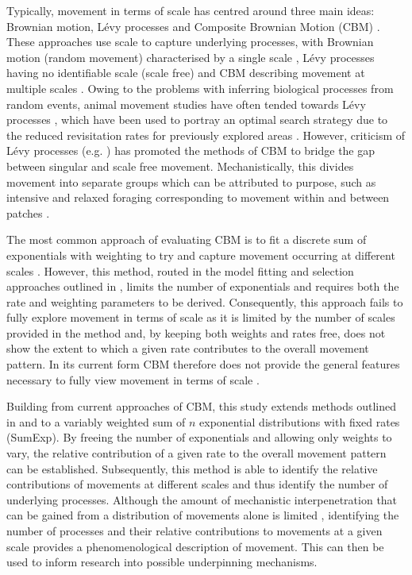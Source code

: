 \documentclass[11pt,usenames,dvipsnames,a4paper]{article}
\begin{document}
\begin{linenumbers}
Typically, movement in terms of scale has centred around three main ideas: Brownian motion, L\'evy processes and Composite Brownian Motion (CBM) \citep{Nathan2008, Reynolds2018}. These approaches use scale to capture underlying processes, with Brownian motion (random movement) characterised by a single scale \citep{Barthelemy2008}, L\'evy processes having no identifiable scale (scale free) \citep{Viswanathan1999, Barthelemy2008, Reynolds2018} and CBM describing movement at multiple scales \citep{Petrovskii2011, Jansen2012}. Owing to the problems with inferring biological processes from random events, animal movement studies have often tended towards L\'evy processes \citep{Harris2012, Ariel2015, Humphries2010, Baronchelli2013, Boyer, Ayala-Orozco2004, Sims2008, Viswanathan1999}, which have been used to portray an optimal search strategy due to the reduced revisitation rates for previously explored areas \citep{Viswanathan1999, Humphries2014}. However, criticism of L\'evy processes (e.g. \cite{Pyke2015}) has promoted the methods of CBM to bridge the gap between singular and scale free movement. Mechanistically, this divides movement into separate groups which can be attributed to purpose, such as intensive and relaxed foraging corresponding to movement within and between patches \citep{Auger-Methe2015}. 

The most common approach of evaluating CBM is to fit a discrete sum of exponentials with weighting to try and capture movement occurring at different scales \citep{DeJager2013, Jansen2012, Kolzsch2015, Wosniack2017}. However, this method, routed in the model fitting and selection approaches outlined in \cite{Murphy2007}, limits the number of exponentials and requires both the rate and weighting parameters to be derived. Consequently, this approach fails to fully explore movement in terms of scale as it is limited by the number of scales provided in the method \citep{Jansen2012} and, by keeping both weights and rates free, does not show the extent to which a given rate contributes to the overall movement pattern. In its current form CBM therefore does not provide the general features necessary to fully view movement in terms of scale \citep{Nathan2008, Patterson2017}. 

Building from current approaches of CBM, this study extends methods outlined in \cite{Petrovskii2011} and \cite{Jansen2012} to a variably weighted sum of $n$ exponential distributions with fixed rates (SumExp). By freeing the number of exponentials and allowing only weights to vary, the relative contribution of a given rate to the overall movement pattern can be established. Subsequently, this method is able to identify the relative contributions of movements at different scales and thus identify the number of underlying processes. Although the amount of mechanistic interpenetration that can be gained from a distribution of movements alone is limited \citep{Bearup2016}, identifying the number of processes and their relative contributions to movements at a given scale provides a phenomenological description of movement. This can then be used to inform research into possible underpinning mechanisms. 


\end{linenumbers}
\end{document}
